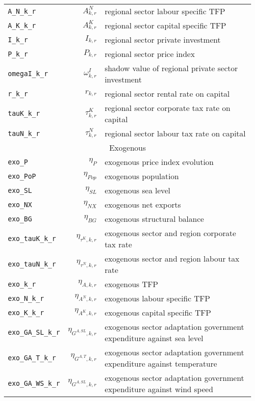 \begin{center}
\begin{longtable}{lrl}
\texttt{A\_N\_k\_r} & ${A^{N}_{k,r}}$ & regional sector labour specific TFP\\
\texttt{A\_K\_k\_r} & ${A^{K}_{k,r}}$ & regional sector capital specific TFP\\
\texttt{I\_k\_r} & ${I_{k,r}}$ & regional sector private investment\\
\texttt{P\_k\_r} & ${P_{k,r}}$ & regional sector price index\\
\texttt{omegaI\_k\_r} & ${\omega^I_{k,r}}$ & shadow value of regional private sector investment\\
\texttt{r\_k\_r} & ${r_{k,r}}$ & regional sector rental rate on capital\\
\texttt{tauK\_k\_r} & ${\tau^{K}_{k,r}}$ & regional sector corporate tax rate on capital\\
\texttt{tauN\_k\_r} & ${\tau^{N}_{k,r}}$ & regional sector labour tax rate on capital\\
\hline
\multicolumn{3}{c}{Exogenous}\\%
\hline
\texttt{exo\_P} & ${\eta_{P}}$ & exogenous price index evolution\\
\texttt{exo\_PoP} & ${\eta_{Pop}}$ & exogenous population\\
\texttt{exo\_SL} & ${\eta_{SL}}$ & exogenous sea level\\
\texttt{exo\_NX} & ${\eta_{NX}}$ & exogenous net exports\\
\texttt{exo\_BG} & ${\eta_{BG}}$ & exogenous structural balance\\
\texttt{exo\_tauK\_k\_r} & ${\eta_{\tau^{K},k,r}}$ & exogenous sector and region corporate tax rate\\
\texttt{exo\_tauN\_k\_r} & ${\eta_{\tau^{N},k,r}}$ & exogenous sector and region labour tax rate\\
\texttt{exo\_k\_r} & ${\eta_{A,k,r}}$ & exogenous TFP\\
\texttt{exo\_N\_k\_r} & ${\eta_{A^{N},k,r}}$ & exogenous labour specific TFP\\
\texttt{exo\_K\_k\_r} & ${\eta_{A^{K},k,r}}$ & exogenous capital specific TFP\\
\texttt{exo\_GA\_SL\_k\_r} & ${\eta_{G^{A,SL},k,r}}$ & exogenous sector adaptation government expenditure against sea level\\
\texttt{exo\_GA\_T\_k\_r} & ${\eta_{G^{A,T},k,r}}$ & exogenous sector adaptation government expenditure against temperature\\
\texttt{exo\_GA\_WS\_k\_r} & ${\eta_{G^{A,SL},k,r}}$ & exogenous sector adaptation government expenditure against wind speed\\

\end{longtable}
\end{center}
